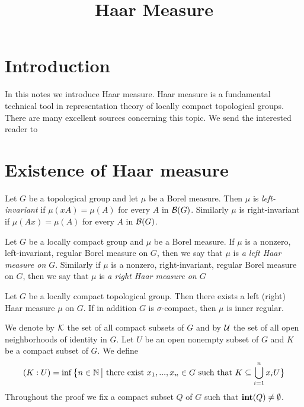 



\title{Haar Measure}
\date{}
\maketitle

\section{Introduction}
\noindent
In this notes we introduce Haar measure. Haar measure is a fundamental technical tool in representation theory of locally compact topological groups. There are many excellent sources concerning this topic. We send the interested reader to

\section{Existence of Haar measure}

\begin{definition}
Let $G$ be a topological group and let $\mu$ be a Borel measure. Then $\mu$ is \textit{left-invariant} if $\mu(xA) = \mu(A)$ for every $A$ in ${\mathcal B}(G)$. Similarly $\mu$ is right-invariant if $\mu(Ax) = \mu(A)$ for every $A$ in ${\mathcal B}(G)$.
\end{definition}

\begin{definition}
Let $G$ be a locally compact group and $\mu$ be a Borel measure. If $\mu$ is a nonzero, left-invariant, regular Borel measure on $G$, then we say that $\mu$ is \textit{a left Haar measure on $G$}. Similarly if $\mu$ is a nonzero, right-invariant, regular Borel measure on $G$, then we say that $\mu$ is \textit{a right Haar measure on $G$} 
\end{definition}

\begin{theorem}
Let $G$ be a locally compact topological group. Then there exists a left (right) Haar measure $\mu$ on $G$. If in addition $G$ is $\sigma$-compact, then $\mu$ is inner regular.
\end{theorem}
\noindent
We denote by ${\mathcal K}$ the set of all compact subsets of $G$ and by ${\mathcal U}$ the set of all open neighborhoods of identity in $G$. Let $U$ be an open nonempty subset of $G$ and $K$ be a compact subset of $G$. We define
$$(K:U) = \inf \big\{n\in {\mathbb N}\,\big|\mbox{ there exist }x_1,...,x_n\in G\mbox{ such that }K\subseteq \bigcup_{i=1}^nx_iU\big\}$$
Throughout the proof we fix a compact subset $Q$ of $G$ such that $\mathbf{int}(Q) \neq \emptyset$.

